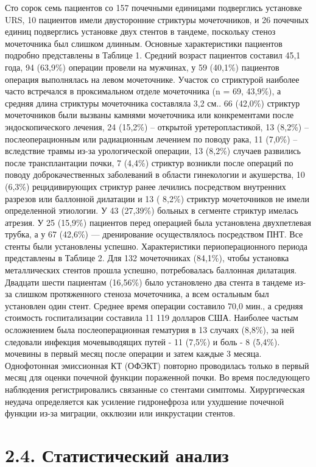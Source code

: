 Сто сорок семь пациентов со 157 почечными единицами подверглись установке URS, 10 пациентов имели двусторонние стриктуры мочеточников, и 26 почечных единиц подверглись установке двух стентов в тандеме, поскольку стеноз мочеточника был слишком длинным. Основные характеристики пациентов подробно представлены в Таблице 1. Средний возраст пациентов составил 45,1 года, 94 (63,9\%) операции провели на мужчинах, у 59 (40,1\%) пациентов операция выполнялась на левом мочеточнике. Участок со стриктурой наиболее часто встречался в проксимальном отделе мочеточника (n = 69, 43,9\%), а средняя длина стриктуры мочеточника составляла 3,2 см.. 66 (42,0\%) стриктур мочеточников были вызваны камнями мочеточника или конкрементами после эндоскопического лечения, 24 (15,2\%) – открытой уретеропластикой, 13 (8,2\%) – послеоперационным или радиационным лечением по поводу рака, 11 (7,0\%) – вследствие травмы из-за урологической операции, 13 (8,2\%) случаев развились после трансплантации почки, 7 (4,4\%) стриктур возникли после операций по поводу доброкачественных заболеваний в области гинекологии и акушерства, 10 (6,3\%) рецидивирующих стриктур ранее лечились посредством внутренних разрезов или баллонной дилатации и 13 ( 8,2\%) стриктур мочеточников не имели определенной этиологии. У 43 (27,39\%) больных в сегменте стриктур имелась атрезия. У 25 (15,9\%) пациентов перед операцией была установлена двухпетлевая трубка, а у 67 (42,6\%) — дренирование осуществлялось посредством ПНТ.
Все стенты были установлены успешно. Характеристики периоперационного периода представлены в Таблице 2. Для 132 мочеточниках (84,1\%), чтобы установка металлических стентов прошла успешно, потребовалась баллонная дилатация. Двадцати шести пациентам (16,56\%) было установлено два стента в тандеме из-за слишком протяженного стеноза мочеточника, а всем остальным был установлен один стент. Среднее время операции составило 70,0 мин., а средняя стоимость госпитализации составила 11 119 долларов США. Наиболее частым осложнением была послеоперационная гематурия в 13 случаях (8,8\%), за ней следовали инфекция мочевыводящих путей - 11 (7,5\%) и боль - 8 (5,4\%). мочевины в первый месяц после операции и затем каждые 3 месяца. Однофотонная эмиссионная КТ (ОФЭКТ) повторно проводилась только в первый месяц для оценки почечной функции пораженной почки. Во время последующего наблюдения регистрировались связанные со стентами симптомы. Хирургическая неудача определяется как усиление гидронефроза или ухудшение почечной функции из-за миграции, окклюзии или инкрустации стентов.

\section{2.4. Статистический анализ}


